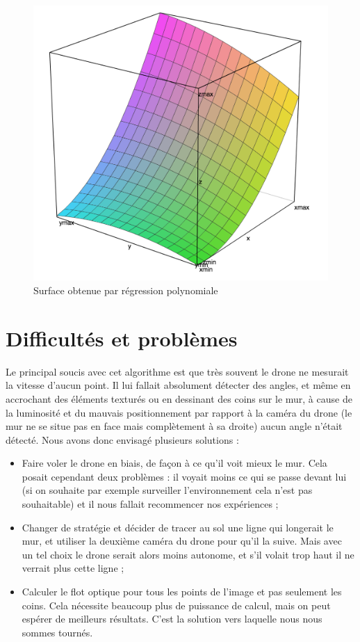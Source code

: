 \documentclass[titlepage,11pt,a4paper]{article}
\begin{document}
\begin{figure}
	\caption{\label{regression} Surface obtenue par régression polynomiale}
	\includegraphics[scale=0.8]{images/surface-regression.png}
\end{figure}


\section{Difficultés et problèmes}
Le principal soucis avec cet algorithme est que très souvent le drone ne mesurait la vitesse d'aucun point. Il lui fallait absolument détecter des angles, et même en accrochant des éléments texturés ou en dessinant des coins sur le mur, à cause de la luminosité et du mauvais positionnement par rapport à la caméra du drone (le mur ne se situe pas en face mais complètement à sa droite) aucun angle n'était détecté. Nous avons donc envisagé plusieurs solutions :
\begin{itemize}
	\item Faire voler le drone en biais, de façon à ce qu'il voit mieux le mur. Cela posait cependant deux problèmes : il voyait moins ce qui se passe devant lui (si on souhaite par exemple surveiller l'environnement cela n'est pas souhaitable) et il nous fallait recommencer nos expériences ;
	\item Changer de stratégie et décider de tracer au sol une ligne qui longerait le mur, et utiliser la deuxième caméra du drone pour qu'il la suive. Mais avec un tel choix le drone serait alors moins autonome, et s'il volait trop haut il ne verrait plus cette ligne ;
	\item Calculer le flot optique pour tous les points de l'image et pas seulement les coins. Cela nécessite beaucoup plus de puissance de calcul, mais on peut espérer de meilleurs résultats. C'est la solution vers laquelle nous nous sommes tournés.
\end{itemize}
\end{document}
